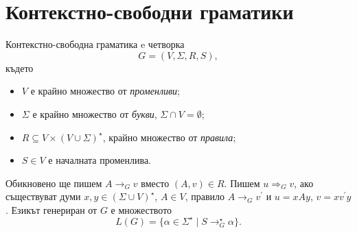 \section{Контекстно-свободни граматики}
\begin{dfn}
  Контекстно-свободна граматика e четворка \[G = (V,\Sigma,R,S),\]
  където
  \begin{itemize}
  \item
    $V$ е крайно множество от {\em променливи};
  \item
    $\Sigma$ е крайно множество от {\em букви}, $\Sigma \cap V = \emptyset$;
  \item
    $R \subseteq V\times (V\cup\Sigma)^\star$, крайно множество от {\em правила};
  \item
    $S \in V$ е началната променлива. 
  \end{itemize}
  Обикновено ще пишем $A \rightarrow_G v$ вместо $(A,v) \in R$.
  Пишем $u \Rightarrow_G v$, ако съществуват думи $x,y\in (\Sigma\cup V)^\star$, $A\in V$,
  правило $A\rightarrow_G v^\prime$ и $u = xAy$, $v = xv^\prime y$.
  Езикът генериран от $G$ е множеството
  \[L(G) = \{\alpha\in\Sigma^\star\mid S \rightarrow^\star_G \alpha\}.\]
\end{dfn}

